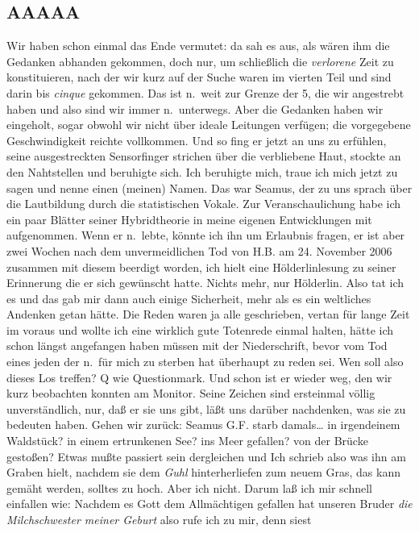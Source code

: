 \documentclass[
]{article}
\author{}
\date{\vspace{-2.5em}}
\begin{document}
\subsection{AAAAA}\label{aaaaa}

Wir haben schon einmal das Ende vermutet: da sah es aus, als wären ihm
die Gedanken abhanden gekommen, doch nur, um schließlich die
\emph{verlorene} Zeit zu konstituieren, nach der wir kurz auf der Suche
waren im vierten Teil und sind darin bis \emph{cinque} gekommen. Das ist
n.~weit zur Grenze der 5, die wir angestrebt haben und also sind wir
immer n.~unterwegs. Aber die Gedanken haben wir eingeholt, sogar obwohl
wir nicht über ideale Leitungen verfügen; die vorgegebene
Geschwindigkeit reichte vollkommen. Und so fing er jetzt an uns zu
erfühlen, seine ausgestreckten Sensorfinger strichen über die
verbliebene Haut, stockte an den Nahtstellen und beruhigte sich. Ich
beruhigte mich, traue ich mich jetzt zu sagen und nenne einen (meinen)
Namen. Das war Seamus, der zu uns sprach über die Lautbildung durch die
statistischen Vokale. Zur Veranschaulichung habe ich ein paar Blätter
seiner Hybridtheorie in meine eigenen Entwicklungen mit aufgenommen.
Wenn er n.~lebte, könnte ich ihn um Erlaubnis fragen, er ist aber zwei
Wochen nach dem unvermeidlichen Tod von H.B. am 24. November 2006
zusammen mit diesem beerdigt worden, ich hielt eine Hölderlinlesung zu
seiner Erinnerung die er sich gewünscht hatte. Nichts mehr, nur
Hölderlin. Also tat ich es und das gab mir dann auch einige Sicherheit,
mehr als es ein weltliches Andenken getan hätte. Die Reden waren ja alle
geschrieben, vertan für lange Zeit im voraus und wollte ich eine
wirklich gute Totenrede einmal halten, hätte ich schon längst angefangen
haben müssen mit der Niederschrift, bevor vom Tod eines jeden der n.~für
mich zu sterben hat überhaupt zu reden sei. Wen soll also dieses Los
treffen? Q wie Questionmark. Und schon ist er wieder weg, den wir kurz
beobachten konnten am Monitor. Seine Zeichen sind ersteinmal völlig
unverständlich, nur, daß er sie uns gibt, läßt uns darüber nachdenken,
was sie zu bedeuten haben. Gehen wir zurück: Seamus G.F. starb
damals\ldots{} in irgendeinem Waldstück? in einem ertrunkenen See? ins
Meer gefallen? von der Brücke gestoßen? Etwas mußte passiert sein
dergleichen und Ich schrieb also was ihn am Graben hielt, nachdem sie
dem \emph{Guhl} hinterherliefen zum neuem Gras, das kann gemäht werden,
solltes zu hoch. Aber ich nicht. Darum laß ich mir schnell einfallen
wie: Nachdem es Gott dem Allmächtigen gefallen hat unseren Bruder
\emph{die Milchschwester meiner Geburt} also rufe ich zu mir, denn siest
\end{document}
